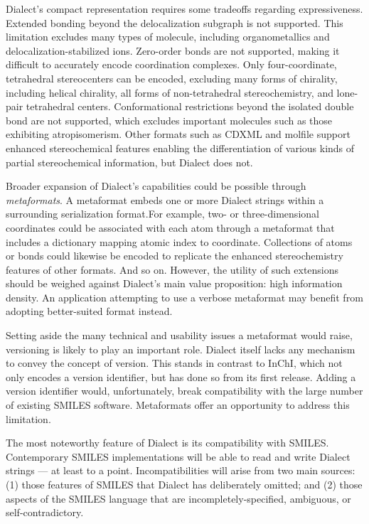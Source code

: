 \documentclass{article}
\begin{document}
Dialect's compact representation requires some tradeoffs regarding expressiveness. Extended bonding beyond the delocalization subgraph is not supported. This limitation excludes many types of molecule, including organometallics and delocalization-\-stabilized ions. Zero-\-order bonds are not supported, making it difficult to accurately encode coordination complexes. Only four-\-coordinate, tetrahedral stereocenters can be encoded, excluding many forms of chirality, including helical chirality, all forms of non-\-tetrahedral stereochemistry, and lone-\-pair tetrahedral centers. Conformational restrictions beyond the isolated double bond are not supported, which excludes important molecules such as those exhibiting atropisomerism. Other formats such as CDXML and molfile support enhanced stereochemical features enabling the differentiation of various kinds of partial stereochemical information, but Dialect does not.

Broader expansion of Dialect's capabilities could be possible through \textit{metaformats}. A metaformat embeds one or more Dialect strings within a surrounding serialization format.For example, two- or three-dimensional coordinates could be associated with each atom through a metaformat that includes a dictionary mapping atomic index to coordinate. Collections of atoms or bonds could likewise be encoded to replicate the enhanced stereochemistry features of other formats. And so on. However, the utility of such extensions should be weighed against Dialect's main value proposition: high information density. An application attempting to use a verbose metaformat may benefit from adopting better-suited format instead.

Setting aside the many technical and usability issues a metaformat would raise, versioning is likely to play an important role. Dialect itself lacks any mechanism to convey the concept of version. This stands in contrast to InChI, which not only encodes a version identifier, but has done so from its first release. Adding a version identifier would, unfortunately, break compatibility with the large number of existing SMILES software. Metaformats offer an opportunity to address this limitation.

The most noteworthy feature of Dialect is its compatibility with SMILES. Contemporary SMILES implementations will be able to read and write Dialect strings --- at least to a point. Incompatibilities will arise from two main sources: (1) those features of SMILES that Dialect has deliberately omitted; and (2) those aspects of the SMILES language that are incompletely-specified, ambiguous, or self-contradictory.
\end{document}
